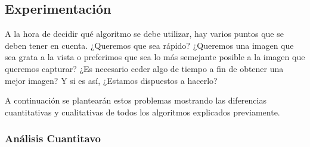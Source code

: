 \newpage
\subsection{Experimentación}

A la hora de decidir qué algoritmo se debe utilizar, hay varios puntos que se deben tener en cuenta. ¿Queremos que sea rápido? ¿Queremos una imagen que sea grata a la vista o preferimos que sea lo más semejante posible a la imagen que queremos capturar? ¿Es necesario ceder algo de tiempo a fin de obtener una mejor imagen? Y si es así, ¿Estamos dispuestos a hacerlo? 

A continuación se plantearán estos problemas mostrando las diferencias cuantitativas y cualitativas de todos los algoritmos explicados previamente.

\subsubsection{Análisis Cuantitavo}

